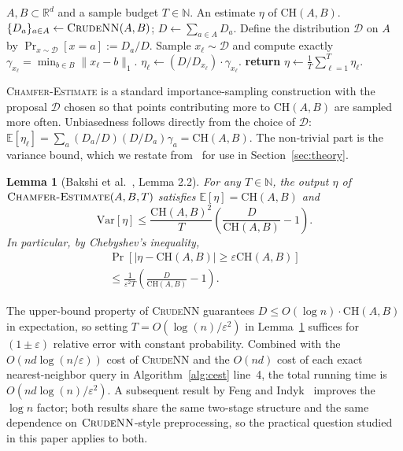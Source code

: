 \documentclass[conference]{IEEEtran}
\newtheorem{lemma}{Lemma}
\begin{document}
\begin{algorithm}[t]
\caption{$\textsc{Chamfer-Estimate}(A, B, T)$}
\label{alg:cest}
\begin{algorithmic}[1]
\REQUIRE $A, B \subset \mathbb{R}^d$ and a sample budget $T \in \mathbb{N}$.
\ENSURE An estimate $\eta$ of $\mathrm{CH}(A, B)$.
\STATE $\{D_a\}_{a \in A} \gets \textsc{CrudeNN}(A, B)$;\quad
       $D \gets \sum_{a \in A} D_a$.
\STATE Define the distribution $\mathcal{D}$ on $A$ by
       $\Pr_{x \sim \mathcal{D}}[x = a] := D_a / D$.
    \STATE Sample $x_\ell \sim \mathcal{D}$ and compute exactly
           $\gamma_{x_\ell} = \min_{b \in B} \|x_\ell - b\|_1$.
    \STATE $\eta_\ell \gets (D / D_{x_\ell}) \cdot \gamma_{x_\ell}$.
\ENDFOR
\STATE \textbf{return} $\eta \gets \tfrac{1}{T} \sum_{\ell=1}^T \eta_\ell$.
\end{algorithmic}
\end{algorithm}

\textsc{Chamfer-Estimate} is a standard importance-sampling
construction with the proposal $\mathcal{D}$ chosen so that points
contributing more to $\mathrm{CH}(A, B)$ are sampled more often.
Unbiasedness follows directly from the choice of $\mathcal{D}$:
$\mathbb{E}[\eta_\ell] = \sum_a (D_a / D)(D / D_a) \gamma_a
= \mathrm{CH}(A, B)$. The non-trivial part is the variance bound,
which we restate from~\cite{bakshi2023near} for use in
Section~\ref{sec:theory}.

\begin{lemma}[Bakshi et al.\ \cite{bakshi2023near}, Lemma 2.2]
\label{lem:is-variance}
For any $T \in \mathbb{N}$, the output $\eta$ of
$\textsc{Chamfer-Estimate}(A, B, T)$ satisfies
$\mathbb{E}[\eta] = \mathrm{CH}(A, B)$ and
\begin{equation}
    \mathrm{Var}[\eta] \leq
    \frac{\mathrm{CH}(A, B)^2}{T}
    \left( \frac{D}{\mathrm{CH}(A, B)} - 1 \right).
\label{eq:is-variance}
\end{equation}
In particular, by Chebyshev's inequality,
\begin{multline}
\Pr\!\left[
|\eta-\mathrm{CH}(A,B)|
\ge
\varepsilon\mathrm{CH}(A,B)
\right] \\
\le
\frac{1}{\varepsilon^2T}
\left(
\frac{D}{\mathrm{CH}(A,B)}-1
\right).
\label{eq:is-chebyshev}
\end{multline}
\end{lemma}

The upper-bound property of \textsc{CrudeNN} guarantees
$D \leq O(\log n) \cdot \mathrm{CH}(A, B)$ in expectation, so setting
$T = O(\log(n) / \varepsilon^2)$ in Lemma~\ref{lem:is-variance} suffices
for $(1 \pm \varepsilon)$ relative error with constant probability.
Combined with the $O(nd \log(n/\varepsilon))$ cost of \textsc{CrudeNN}
and the $O(nd)$ cost of each exact nearest-neighbor query in
Algorithm~\ref{alg:cest} line~4, the total running time is
$O(nd \log(n) / \varepsilon^2)$. A subsequent result by Feng and
Indyk~\cite{feng2025faster} improves the $\log n$ factor; both results
share the same two-stage structure and the same dependence on
$\textsc{CrudeNN}$-style preprocessing, so the practical question
studied in this paper applies to both.
\end{document}
